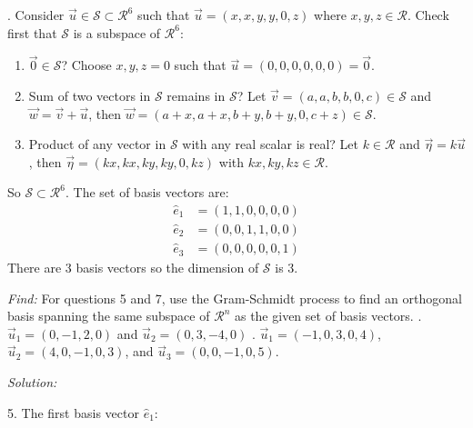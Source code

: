 \documentclass[11pt]{homework}
\begin{document}
\newline
{}. Consider $\vec u \in \mathcal{S} \subset \mathcal{R}^6$
such that $\vec u = ( x,x, y,y, 0, z)$ where $x, y, z \in \mathcal{R}$.
Check first that $\mathcal{S}$ is a subspace of $\mathcal{R}^6$:
\begin{enumerate}
  \item $\vec 0 \in \mathcal{S}$? 
        Choose $x,y,z = 0$ such that $\vec u = (0,0,0,0,0,0) = \vec 0$.
  \item Sum of two vectors in $\mathcal{S}$ remains in $\mathcal{S}$?
        Let $\vec v = ( a,a, b,b, 0, c) \in \mathcal{S}$ and
        $ \vec w = \vec v + \vec u$, then
        $\vec w = (a+x, a+x, b+y, b+y, 0, c+z) \in \mathcal{S}$.
  \item Product of any vector in $\mathcal{S}$ with any real scalar is real?
        Let $k \in \mathcal{R}$ and $\vec \eta = k \vec u$, then
        $\vec \eta = (kx, kx, ky,  ky, 0, kz)$ with $kx, ky, kz \in \mathcal{R}$.
\end{enumerate}
So $\mathcal{S} \subset \mathcal{R}^6$.
\newline
The set of basis vectors are:
\begin{align*}
  \hat{e}_1 &= (1, 1, 0, 0, 0, 0) \\
  \hat{e}_2 &= (0, 0, 1, 1, 0, 0) \\
  \hat{e}_3 &= (0, 0, 0, 0, 0, 1)
\end{align*}
There are 3 basis vectors so the dimension of $\mathcal{S}$ is 3.

\emph{Find:}
\newline
For questions 5 and 7, use the Gram-Schmidt process to find an
orthogonal basis spanning the same subspace of $\mathcal{R}^n$ 
as the given set of basis vectors.
. $\vec u_1 = (0, -1, 2, 0)$ and $\vec u_2 = (0, 3, -4, 0)$
. $\vec u_1 = (-1, 0, 3, 0, 4)$, $\vec u_2 = (4, 0, -1, 0, 3)$, and $\vec u_3 = (0,0,-1, 0, 5)$.

\emph{Solution:}

5. The first basis vector $\hat{e}_1$:
\end{document}
